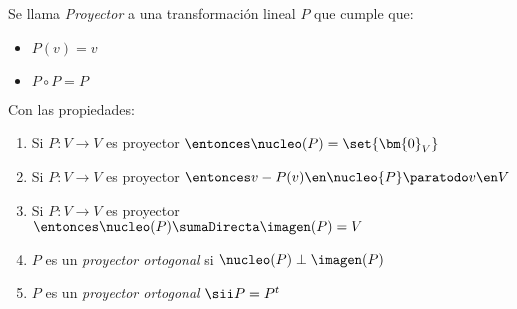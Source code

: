 \begin{enumerate}[label=\tiny\purple{\faIcon{snowman}}]
        Se llama  \textit{Proyector} a una transformación lineal $P$ que cumple que:
        \begin{itemize}
          \item $P(v) = v$
          \item $P \circ P = P$
        \end{itemize}
        Con las propiedades:
        \begin{enumerate}[label=\poo]
          \item Si $P: V \to V$ es proyector $\entonces \nucleo(P) = \set{\bm{0}_V}$
          \item Si $P: V \to V$ es proyector $\entonces v - P(v) \en \nucleo{P} \paratodo v \en V$
          \item Si $P: V \to V$ es proyector $\entonces \nucleo(P) \sumaDirecta \imagen(P) = V$
          \item $P$ es un \textit{proyector ortogonal} si $\nucleo(P) \perp \imagen(P)$
          \item $P$ es un \textit{proyector ortogonal} $\sii P = P^t$
        \end{enumerate}
\end{enumerate}
